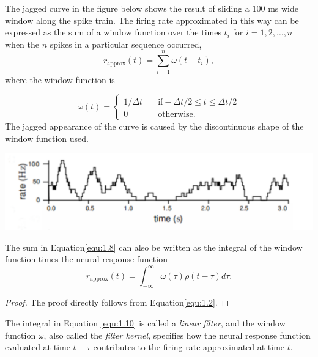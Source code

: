 \begin{exm}
  \label{fig:1.4C}
  The jagged curve in  the figure below shows the result of sliding a $100$ ms wide
window along the spike train.  The firing rate approximated in 
this way
can be expressed as the sum of a window function over the times $t_i$ for
$i = 1 , 2 ,\dots, n$ when the $n$ spikes in a particular sequence occurred,
\begin{equation}
  \label{equ:1.8}
  r_{\text{approx}}(t)=\sum_{i = 1}^{n}\omega(t-t_i), 
\end{equation}
where the window function is

\begin{equation}
  \label{equ:1.9}
  \omega(t)=\left\{
    \begin{aligned}
      1/\Delta t \quad &\text{if} -\Delta t/2\leq t\leq \Delta t/2\\
      0 \quad & \text{otherwise}.
    \end{aligned}
  \right.
\end{equation}
The jagged appearance of the curve is caused 
by the discontinuous shape of the window function used.
\end{exm}

\begin{center}
  \includegraphics[scale=0.054]{./png/fig_1_4C.png}
\end{center}

\begin{prop}
  The sum in Equation\ref{equ:1.8} can also be written as the integral of the window
function times the neural response function
\begin{equation}
  \label{equ:1.10}
  r_{\text{approx}}(t)=\int_{-\infty}^{\infty}\omega(\tau)\rho(t-\tau)d\tau.
\end{equation}
\begin{proof}
  The proof directly follows from Equation\ref{equ:1.2}.
\end{proof}
\end{prop}

\begin{defn}
  The integral in Equation \ref{equ:1.10} is called a \emph{linear filter}, and the window 
  function $\omega$, also called the \emph{filter kernel}, specifies how the neural 
  response function evaluated at time $t-\tau$ contributes to the firing rate approximated 
  at time $t$.
\end{defn}

